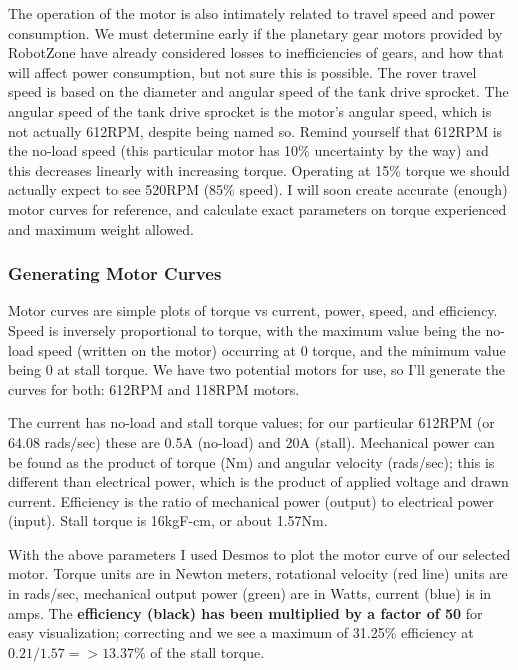 \documentclass[a4paper, 10pt]{article}
\begin{document}
		The operation of the motor is also intimately related to travel speed and power consumption. We must determine early if the planetary gear motors provided by RobotZone have already considered losses to inefficiencies of gears, and how that will affect power consumption, but not sure this is possible. The rover travel speed is based on the diameter and angular speed of the tank drive sprocket. The angular speed of the tank drive sprocket is the motor's angular speed, which is not actually 612RPM, despite being named so. Remind yourself that 612RPM is the no-load speed (this particular motor has 10\% uncertainty by the way) and this decreases linearly with increasing torque. Operating at 15\% torque we should actually expect to see 520RPM (85\% speed). I will soon create accurate (enough) motor curves for reference, and calculate exact parameters on torque experienced and maximum weight allowed. 
		
		\subsubsection*{Generating Motor Curves}
		Motor curves are simple plots of torque vs current, power, speed, and efficiency. Speed is inversely proportional to torque, with the maximum value being the no-load speed (written on the motor) occurring at 0 torque, and the minimum value being 0 at stall torque. We have two potential motors for use, so I'll generate the curves for both: 612RPM and 118RPM motors.
		
		The current has no-load and stall torque values; for our particular 612RPM (or 64.08 rads/sec) these are 0.5A (no-load) and 20A (stall). Mechanical power can be found as the product of torque (Nm) and angular velocity (rads/sec); this is different than electrical power, which is the product of applied voltage and drawn current. Efficiency is the ratio of mechanical power (output) to electrical power (input). Stall torque is 16kgF-cm, or about 1.57Nm.
		
		With the above parameters I used Desmos to plot the motor curve of our selected motor. Torque units are in Newton meters, rotational velocity (red line) units are in rads/sec, mechanical output power (green) are in Watts, current (blue) is in amps. The \textbf{efficiency (black) has been multiplied by a factor of 50} for easy visualization; correcting and we see a maximum of 31.25\% efficiency at $ 0.21/1.57 => 13.37\% $ of the stall torque.
		
\end{document}

